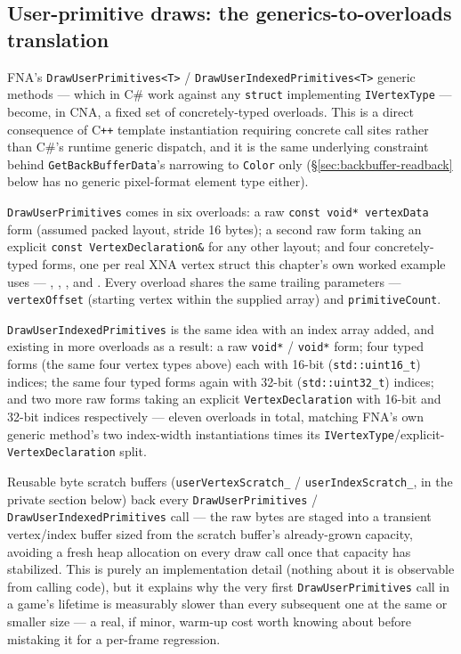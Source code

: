 \subsection{User-primitive draws: the generics-to-overloads translation}

FNA's \texttt{DrawUserPrimitives<T>} / \texttt{DrawUserIndexedPrimitives<T>} generic methods ---
which in C\# work against any \texttt{struct} implementing \texttt{IVertexType} --- become, in
CNA, a fixed set of concretely-typed overloads. This is a direct consequence of C\texttt{++}
template instantiation requiring concrete call sites rather than C\#'s runtime generic
dispatch, and it is the same underlying constraint behind \texttt{GetBackBufferData}'s
narrowing to \texttt{Color} only (\S\ref{sec:backbuffer-readback} below has no generic
pixel-format element type either).

\texttt{DrawUserPrimitives} comes in six overloads: a raw \texttt{const void* vertexData}
form (assumed  packed layout, stride 16 bytes); a second raw form
taking an explicit \texttt{const VertexDeclaration\&} for any other layout; and four
concretely-typed forms, one per real XNA vertex struct this chapter's own worked example uses
--- , ,
, and . Every overload
shares the same trailing parameters --- \texttt{vertexOffset} (starting vertex within the
supplied array) and \texttt{primitiveCount}.

\texttt{DrawUserIndexedPrimitives} is the same idea with an index array added, and existing in
more overloads as a result: a raw \texttt{void*} / \texttt{void*} form; four typed forms
(the same four vertex types above) each with 16-bit (\texttt{std::uint16\_t}) indices; the same
four typed forms again with 32-bit (\texttt{std::uint32\_t}) indices; and two more raw forms
taking an explicit \texttt{VertexDeclaration} with 16-bit and 32-bit indices respectively ---
eleven overloads in total, matching FNA's own generic method's two index-width instantiations
times its \texttt{IVertexType}/explicit-\texttt{VertexDeclaration} split.

\begin{sourcenote}
Reusable byte scratch buffers (\texttt{userVertexScratch\_} / \texttt{userIndexScratch\_}, in the
private section below) back every \texttt{DrawUserPrimitives} / \texttt{DrawUserIndexedPrimitives}
call --- the raw bytes are staged into a transient vertex/index buffer sized from the scratch
buffer's already-grown capacity, avoiding a fresh heap allocation on every draw call once that
capacity has stabilized. This is purely an implementation detail (nothing about it is
observable from calling code), but it explains why the very first \texttt{DrawUserPrimitives}
call in a game's lifetime is measurably slower than every subsequent one at the same or smaller
size --- a real, if minor, warm-up cost worth knowing about before mistaking it for a
per-frame regression.
\end{sourcenote}

